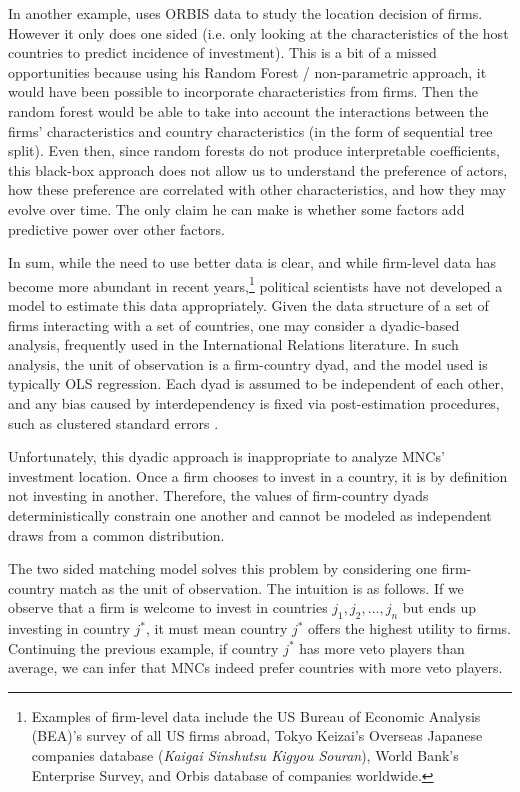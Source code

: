 In another example, \citet{Arel-Bundock2017} uses ORBIS data to study the location decision of
firms. However it only does one sided (i.e. only looking at the characteristics
of the host countries to predict incidence of investment). This is a bit of a
missed opportunities because using his Random Forest / non-parametric approach,
it would have been possible to incorporate characteristics from firms. Then the
random forest would be able to take into account the interactions between the
firms' characteristics and country characteristics (in the form of sequential
tree split). Even then, since random forests do not produce interpretable
coefficients, this black-box approach does not allow us to understand the
preference of actors, how these preference are correlated with other
characteristics, and how they may evolve over time. The only claim he can make
is whether some factors add predictive power over other factors.

In sum, while the need to use better data is clear, and while firm-level data has become more abundant in recent
years,\footnote{Examples of firm-level data include the US Bureau of Economic
Analysis (BEA)'s survey of all US firms abroad, Tokyo Keizai's Overseas Japanese
companies database (\textit{Kaigai Sinshutsu Kigyou Souran}), World Bank's
Enterprise Survey, and Orbis database of companies worldwide.} political
scientists have not developed a model to estimate this data appropriately. Given the data structure of a
set of firms interacting with a set of countries, one may consider a
dyadic-based analysis, frequently used in the International Relations
literature. In such analysis, the unit of observation is a firm-country dyad,
and the model used is typically OLS regression. Each dyad is assumed to be
independent of each other, and any bias caused by interdependency is fixed via
post-estimation procedures, such as clustered standard errors \citep{Dorff2013}.

Unfortunately, this dyadic approach is inappropriate to analyze MNCs' investment
location. Once a firm chooses to invest in a country, it is by definition not
investing in another. Therefore, the values of firm-country dyads
deterministically constrain one another and cannot be modeled as independent
draws from a common distribution.

The two sided matching model solves this problem by considering one firm-country
match as the unit of observation. The intuition is as follows. If we observe
that a firm is welcome to invest in countries $j_1, j_2, \dots, j_n$ but ends up
investing in country $j^*$, it must mean country $j^*$ offers the highest
utility to firms. Continuing the previous example, if country $j^*$ has more
veto players than average, we can infer that MNCs indeed prefer countries with
more veto players.

